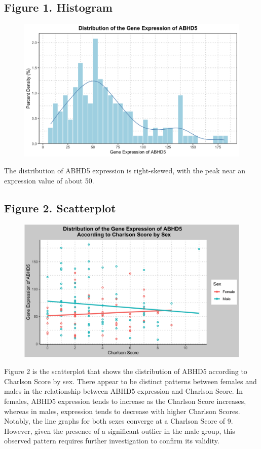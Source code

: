 \documentclass{article}
\begin{document}
\subsection{Figure 1. Histogram}
\begin{figure}[H]
\centering
\includegraphics[width=1\linewidth]{Histogram.png}
\label{fig:histogram}
\end{figure}

The distribution of ABHD5 expression is right-skewed, with the peak near an expression value of about 50.

\subsection{Figure 2. Scatterplot}
\begin{figure}[H]
    \centering
    \includegraphics[width=1\linewidth]{Scatterplot.png}
    \label{fig:placeholder}
\end{figure}

Figure 2 is the scatterplot that shows the distribution of ABHD5 according to Charlson Score by sex. There appear to be distinct patterns between females and males in the relationship between ABHD5 expression and Charlson Score. In females, ABHD5 expression tends to increase as the Charlson Score increases, whereas in males, expression tends to decrease with higher Charlson Scores. Notably, the line graphs for both sexes converge at a Charlson Score of 9. However, given the presence of a significant outlier in the male group, this observed pattern requires further investigation to confirm its validity.
\end{document}
